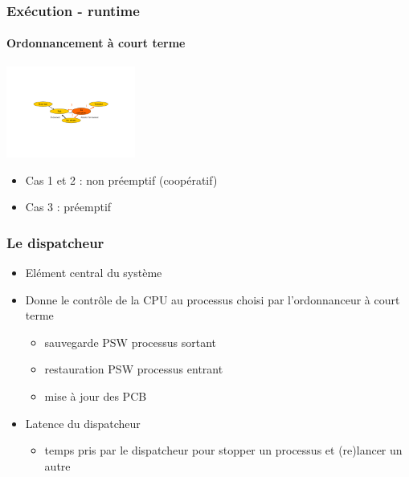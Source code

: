 \begin{frame}
 \frametitle{Exécution - runtime}
 \framesubtitle{Ordonnancement à court terme}
 
 \begin{center}
 \includegraphics[height=3cm]{../illustration/cycle_court_terme.pdf}
 \end{center}
 \begin{itemize}
 \item Cas 1 et 2 : non préemptif (coopératif)
 \item Cas 3 : préemptif
 \end{itemize}
\end{frame}



\begin{frame}
 \frametitle{Le dispatcheur}
 \begin{itemize}
 \item Elément central du système
 \item Donne le contrôle de la CPU au processus choisi par l’ordonnanceur à court terme
\begin{itemize}
\item sauvegarde PSW processus sortant
\item restauration PSW processus entrant
\item mise à jour des PCB
\end{itemize}
\item Latence du dispatcheur
	\begin{itemize}
\item temps pris par le dispatcheur pour stopper un processus et (re)lancer un autre 
\end{itemize}

 \end{itemize}
\end{frame}


